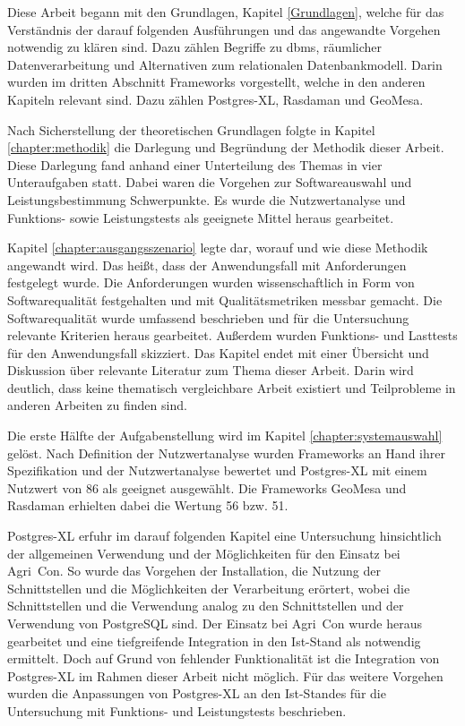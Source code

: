 Diese Arbeit begann mit den Grundlagen, Kapitel \ref{Grundlagen}, welche für das Verständnis der darauf folgenden Ausführungen und das angewandte Vorgehen notwendig zu klären sind.
Dazu zählen Begriffe zu \Gls{dbms}, räumlicher Datenverarbeitung und Alternativen zum relationalen Datenbankmodell.
Darin wurden im dritten Abschnitt Frameworks vorgestellt, welche in den anderen Kapiteln relevant sind.
Dazu zählen Postgres-XL, Rasdaman und GeoMesa.

Nach Sicherstellung der theoretischen Grundlagen folgte in Kapitel \ref{chapter:methodik} die Darlegung und Begründung der Methodik dieser Arbeit.
Diese Darlegung fand anhand einer Unterteilung des Themas in vier Unteraufgaben statt.
Dabei waren die Vorgehen zur Softwareauswahl und Leistungsbestimmung Schwerpunkte.
Es wurde die Nutzwertanalyse und Funktions- sowie Leistungstests als geeignete Mittel heraus gearbeitet.

Kapitel \ref{chapter:ausgangsszenario} legte dar, worauf und wie diese Methodik angewandt wird.
Das heißt, dass der Anwendungsfall mit Anforderungen festgelegt wurde.
Die Anforderungen wurden wissenschaftlich in Form von Softwarequalität festgehalten und mit Qualitätsmetriken messbar gemacht.
Die Softwarequalität wurde umfassend beschrieben und für die Untersuchung relevante Kriterien heraus gearbeitet.
Außerdem wurden Funktions- und Lasttests für den Anwendungsfall skizziert.
Das Kapitel endet mit einer Übersicht und Diskussion über relevante Literatur zum Thema dieser Arbeit.
Darin wird deutlich, dass keine thematisch vergleichbare Arbeit existiert und Teilprobleme in anderen Arbeiten zu finden sind.

Die erste Hälfte der Aufgabenstellung wird im Kapitel \ref{chapter:systemauswahl} gelöst.
Nach Definition der Nutzwertanalyse wurden Frameworks an Hand ihrer Spezifikation und der Nutzwertanalyse bewertet und Postgres-XL mit einem Nutzwert von 86 als geeignet ausgewählt.
Die Frameworks GeoMesa und Rasdaman erhielten dabei die Wertung 56 bzw. 51.

Postgres-XL erfuhr im darauf folgenden Kapitel eine Untersuchung hinsichtlich der allgemeinen Verwendung und der Möglichkeiten für den Einsatz bei Agri~Con.
So wurde das Vorgehen der Installation, die Nutzung der Schnittstellen und die Möglichkeiten der Verarbeitung erörtert, wobei die Schnittstellen und die Verwendung analog zu den Schnittstellen und der Verwendung von PostgreSQL sind.
Der Einsatz bei Agri~Con wurde heraus gearbeitet und eine tiefgreifende Integration in den Ist-Stand als notwendig ermittelt.
Doch auf Grund von fehlender Funktionalität ist die Integration von Postgres-XL im Rahmen dieser Arbeit nicht möglich.
Für das weitere Vorgehen wurden die Anpassungen von Postgres-XL an den Ist-Standes für die Untersuchung mit Funktions- und Leistungstests beschrieben.

